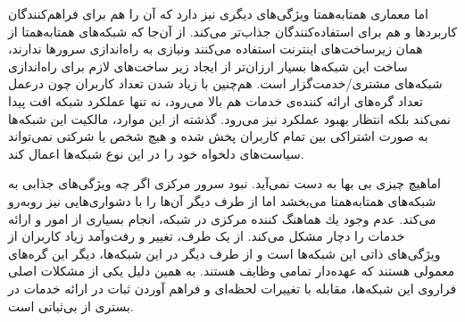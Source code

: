 \documentclass[12pt,twoside]{xepersian-magazine}
\begin{document}
\begin{article}{2}
اما معماری همتابه‌همتا ويژگی‌های ديگری نيز دارد که آن را هم برای فراهم‌کنندگان کاربردها و هم برای استفاده‌کنندگان جذاب‌تر می‌کند.  از آن‌جا که شبکه‌های همتابه‌همتا از همان زيرساخت‌های اينترنت استفاده می‌کنند ونيازی به راه‌اندازی سرورها ندارند، ساخت اين شبكه‌ها بسيار ارزان‌تر از ايجاد زير ساخت‌های لازم برای راه‌اندازی شبكه‌های مشتری/خدمت‌گزار است.  هم‌چنين با زياد شدن تعداد کاربران چون درعمل تعداد گره‌های ارائه کننده‌ی خدمات هم بالا می‌رود، نه تنها عملكرد شبكه افت پيدا نمی‌كند بلكه انتظار بهبود عملکرد نيز می‌رود. گذشته از اين موارد، مالكيت اين شبكه‌ها به صورت اشتراكی بين تمام کاربران پخش شده و هيچ شخص يا شركتی نمی‌تواند سياست‌های دلخواه خود را در اين نوع شبكه‌ها اعمال کند.

اماهيچ چيزی بی‌ بها به دست نمی‌آید. نبود سرور مرکزی اگر چه  ويژگی‌های جذابی به شبکه‌های همتابه‌همتا می‌بخشد اما از طرف ديگر آن‌ها را با دشواری‌هايی نيز روبه‌رو می‌کند.  عدم وجود يك هماهنگ كننده مركزی در شبكه، انجام بسياری از امور و ارائه خدمات را  دچار مشكل می‌کند.  از يک طرف، تغيير و رفت‌وآمد زیاد کاربران از ويژگی‌های ذاتی اين شبکه‌ها است و از طرف ديگر در اين شبكه‌ها، ديگر اين گره‌های معمولی  هستند كه  عهده‌دار تمامی وظايف هستند. به همين دلیل يکی از مشکلات اصلی فراروی اين شبكه‌ها، مقابله با  تغييرات لحظه‌ای و فراهم آوردن ثبات در ارائه  خدمات در بستری از بی‌ثباتی است.
\end{article}

\articlesep

\end{document}
